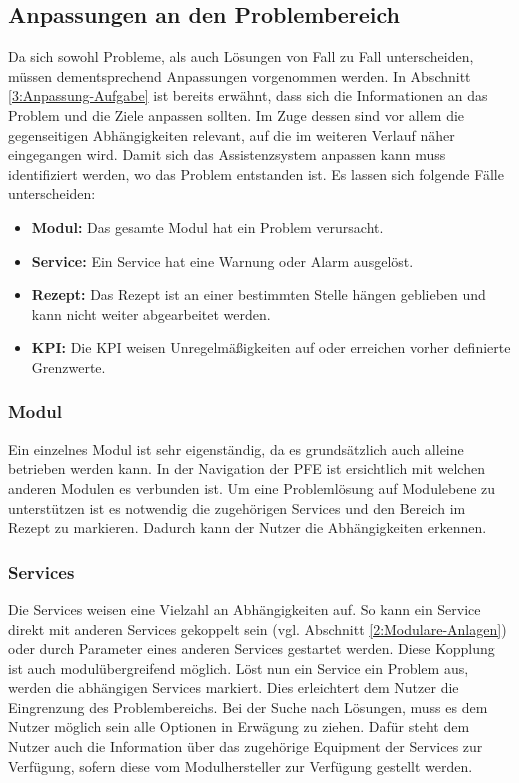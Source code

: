 \subsection{Anpassungen an den Problembereich}
Da sich sowohl Probleme, als auch Lösungen von Fall zu Fall unterscheiden, müssen dementsprechend Anpassungen vorgenommen werden. In Abschnitt \ref{3:Anpassung-Aufgabe} ist bereits erwähnt, dass sich die Informationen an das Problem und die Ziele anpassen sollten. Im Zuge dessen sind vor allem die gegenseitigen Abhängigkeiten relevant, auf die im weiteren Verlauf näher eingegangen wird. Damit sich das Assistenzsystem anpassen kann muss identifiziert werden, wo das Problem entstanden ist. Es lassen sich folgende Fälle unterscheiden:
\begin{itemize}
\item \textbf{Modul:} Das gesamte Modul hat ein Problem verursacht.
\item \textbf{Service:} Ein Service hat eine Warnung oder Alarm ausgelöst.
\item \textbf{Rezept:} Das Rezept ist an einer bestimmten Stelle hängen geblieben und kann nicht weiter abgearbeitet werden.
\item \textbf{KPI:} Die KPI weisen Unregelmäßigkeiten auf oder erreichen vorher definierte Grenzwerte.
\end{itemize}

\subsubsection*{Modul}
Ein einzelnes Modul ist sehr eigenständig, da es grundsätzlich auch alleine betrieben werden kann. In der Navigation der PFE ist ersichtlich mit welchen anderen Modulen es verbunden ist. Um eine Problemlösung auf Modulebene zu unterstützen ist es notwendig die zugehörigen Services und den Bereich im Rezept zu markieren. Dadurch kann der Nutzer die Abhängigkeiten erkennen. 

\subsubsection*{Services}
Die Services weisen eine Vielzahl an Abhängigkeiten auf. So kann ein Service direkt mit anderen Services gekoppelt sein (vgl. Abschnitt \ref{2:Modulare-Anlagen}) oder durch Parameter eines anderen Services gestartet werden. Diese Kopplung ist auch modulübergreifend möglich. Löst nun ein Service ein Problem aus, werden die abhängigen Services markiert. Dies erleichtert dem Nutzer die Eingrenzung des Problembereichs. Bei der Suche nach Lösungen, muss es dem Nutzer möglich sein alle Optionen in Erwägung zu ziehen. Dafür steht dem Nutzer auch die Information über das zugehörige Equipment der Services zur Verfügung, sofern diese vom Modulhersteller zur Verfügung gestellt werden.

